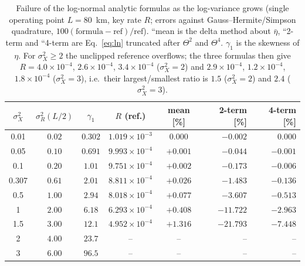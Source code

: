 \documentclass[11pt,a4paper]{article}
\theoremstyle{plain}
\theoremstyle{remark}
\begin{document}
\begin{table}[htbp]
\centering\small
\caption{Failure of the log-normal analytic formulas as the log-variance grows (single operating point $L=80$~km, key rate $R$; errors against Gauss--Hermite/Simpson quadrature, $100(\text{formula}-\text{ref})/\text{ref}$). ``mean is the delta method about $\bar\eta$, ``2-term and ``4-term are Eq.~\eqref{eq:ln} truncated after $\Theta^2$ and $\Theta^4$. $\gamma_1$ is the skewness of $\eta$. For $\sigma_X^2\ge2$ the unclipped reference overflows; the three formulas then give $R=4.0\times10^{-4}$, $2.6\times10^{-4}$, $3.4\times10^{-4}$ ($\sigma_X^2=2$) and $2.9\times10^{-4}$, $1.2\times10^{-4}$, $1.8\times10^{-4}$ ($\sigma_X^2=3$), i.e.\ their largest/smallest ratio is $1.5$ ($\sigma_X^2=2$) and $2.4$ ($\sigma_X^2=3$).}
\label{tab:stress}
\begin{tabular}{cccccrr}
\toprule
$\sigma_X^2$ & $\sigma_R^2(L/2)$ & $\gamma_1$ & $R$ (ref.) & mean [\%] & 2-term [\%] & 4-term [\%]\\
\midrule
0.01 & $0.02$ & $0.302$ & $1.019\times10^{-3}$ & $0.000$ & $-0.002$ & $0.000$ \\
0.05 & $0.10$ & $0.691$ & $9.993\times10^{-4}$ & $+0.001$ & $-0.044$ & $-0.001$ \\
0.1 & $0.20$ & $1.01$ & $9.751\times10^{-4}$ & $+0.002$ & $-0.173$ & $-0.006$ \\
0.307 & $0.61$ & $2.01$ & $8.811\times10^{-4}$ & $+0.026$ & $-1.483$ & $-0.136$ \\
0.5 & $1.00$ & $2.94$ & $8.018\times10^{-4}$ & $+0.077$ & $-3.607$ & $-0.513$ \\
1 & $2.00$ & $6.18$ & $6.293\times10^{-4}$ & $+0.408$ & $-11.722$ & $-2.963$ \\
1.5 & $3.00$ & $12.1$ & $4.952\times10^{-4}$ & $+1.316$ & $-21.793$ & $-7.448$ \\
2 & $4.00$ & $23.7$ & -- & -- & -- & -- \\
3 & $6.00$ & $96.5$ & -- & -- & -- & -- \\

\bottomrule
\end{tabular}
\end{table}
\end{document}
